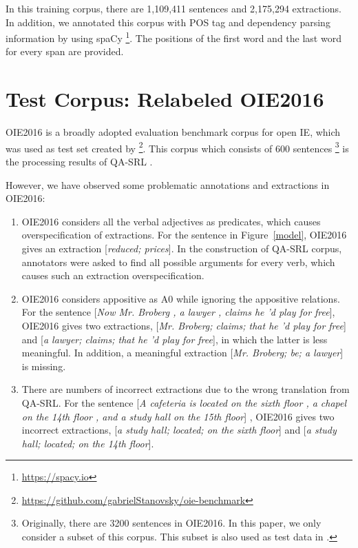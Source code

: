 \documentclass[letterpaper]{article} %
\begin{document}
In this training corpus, there are 1,109,411 sentences and 2,175,294 extractions. In addition, we annotated this corpus with POS tag and dependency parsing information by using spaCy \footnote{\url{https://spacy.io}}. The positions of the first word and the last word for every span are provided.

\section{Test Corpus: Relabeled OIE2016}
OIE2016 is a broadly adopted evaluation benchmark corpus for open IE, which was used as test set created by \cite{Stanovsky2016CreatingAL}\footnote{\url{https://github.com/gabrielStanovsky/oie-benchmark}}. This corpus which consists of 600 sentences \footnote{Originally, there are 3200 sentences in OIE2016. In this paper, we only consider a subset of this corpus. This subset is also used as test data in \cite{Stanovsky2018SupervisedOI}.} is the processing results of QA-SRL \cite{He2015QuestionAnswerDS}.

However, we have observed some problematic annotations and extractions in OIE2016:
\begin{enumerate}
\item OIE2016 considers all the verbal adjectives as predicates, which causes overspecification of extractions. For the sentence in Figure~\ref{model}, OIE2016 gives an extraction [\emph{reduced; prices}]. In the construction of QA-SRL corpus, annotators were asked to find all possible arguments for every verb, which causes such an extraction overspecification. 
\item OIE2016 considers appositive as A0 while ignoring the appositive relations. For the sentence [\emph{Now Mr. Broberg , a lawyer , claims he 'd play for free}], OIE2016 gives two extractions, [\emph{Mr. Broberg; claims; that he 'd play for free}] and [\emph{a lawyer; claims; that he 'd play for free}], in which the latter is less meaningful. In addition, a meaningful extraction [\emph{Mr. Broberg; be; a lawyer}] is missing. 
\item There are numbers of incorrect extractions due to the wrong translation from QA-SRL. For the sentence  [\emph{A cafeteria is located on the sixth floor , a chapel on the 14th floor , and a study hall on the 15th floor}] , OIE2016 gives two incorrect extractions, [\emph{a study hall; located; on the sixth floor}] and [\emph{a study hall; located; on the 14th floor}]. 
\end{enumerate}
\end{document}
